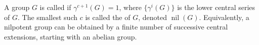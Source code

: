 A group $G$ is called  if $\gamma^{c+1}(G) = 1$, where $\{\gamma^i(G)\}$ is the lower central series of $G$. The smallest such $c$ is called the  of $G$, denoted $\operatorname{nil}(G)$. Equivalently, a nilpotent group can be obtained by a finite number of successive central extensions, starting with an abelian group.

